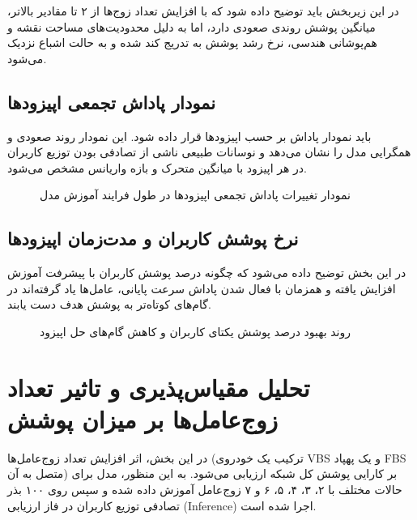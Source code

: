\documentclass[a4paper,12pt,oneside]{report}
\begin{document}
در این زیربخش باید توضیح داده شود که با افزایش تعداد زوج‌ها از ۲ تا مقادیر بالاتر، میانگین پوشش روندی صعودی دارد، اما به دلیل محدودیت‌های مساحت نقشه و هم‌پوشانی هندسی، نرخ رشد پوشش به تدریج کند شده و به حالت اشباع نزدیک می‌شود.

\subsection{نمودار پاداش تجمعی اپیزودها}
باید نمودار پاداش بر حسب اپیزودها قرار داده شود. این نمودار روند صعودی و همگرایی مدل را نشان می‌دهد و نوسانات طبیعی ناشی از تصادفی بودن توزیع کاربران در هر اپیزود با میانگین متحرک و بازه واریانس مشخص می‌شود.

\begin{figure}[H]
    \centering
    \caption{نمودار تغییرات پاداش تجمعی اپیزودها در طول فرایند آموزش مدل}
    \label{fig:reward_curve}
\end{figure}

\subsection{نرخ پوشش کاربران و مدت‌زمان اپیزودها}
در این بخش توضیح داده می‌شود که چگونه درصد پوشش کاربران با پیشرفت آموزش افزایش یافته و همزمان با فعال شدن پاداش سرعت پایانی، عامل‌ها یاد گرفته‌اند در گام‌های کوتاه‌تر به پوشش هدف دست یابند.

\begin{figure}[H]
    \centering
    \caption{روند بهبود درصد پوشش یکتای کاربران و کاهش گام‌های حل اپیزود}
    \label{fig:coverage_and_steps}
\end{figure}

\section{تحلیل مقیاس‌پذیری و تاثیر تعداد زوج‌عامل‌ها بر میزان پوشش}
در این بخش، اثر افزایش تعداد زوج‌عامل‌ها (ترکیب یک خودروی VBS و یک پهپاد FBS متصل به آن) بر کارایی پوشش کل شبکه ارزیابی می‌شود. به این منظور، مدل برای حالات مختلف با ۲، ۳، ۴، ۵، ۶ و ۷ زوج‌عامل آموزش داده شده و سپس روی ۱۰۰ بذر تصادفی توزیع کاربران در فاز ارزیابی (Inference) اجرا شده است.
\end{document}

